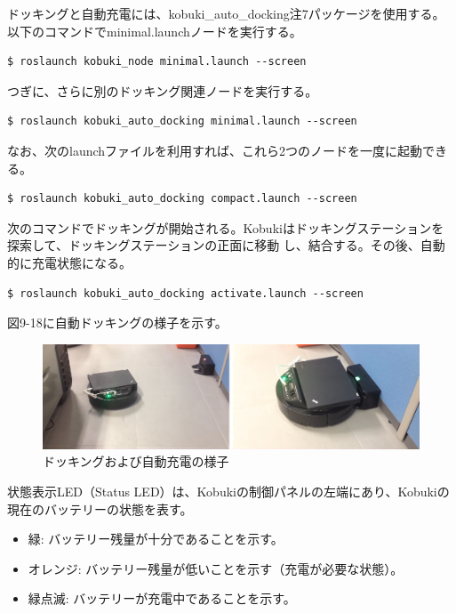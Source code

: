 \begin{itemize}
ドッキングと自動充電には、kobuki\_auto\_docking注7パッケージを使用する。以下のコマンドでminimal.launchノードを実行する。

\begin{lstlisting}[language=ROS]
$ roslaunch kobuki_node minimal.launch --screen
\end{lstlisting}

つぎに、さらに別のドッキング関連ノードを実行する。

\begin{lstlisting}[language=ROS]
$ roslaunch kobuki_auto_docking minimal.launch --screen
\end{lstlisting}

なお、次のlaunchファイルを利用すれば、これら2つのノードを一度に起動できる。

\begin{lstlisting}[language=ROS]
$ roslaunch kobuki_auto_docking compact.launch --screen
\end{lstlisting}

次のコマンドでドッキングが開始される。Kobukiはドッキングステーションを探索して、ドッキングステーションの正面に移動  し、結合する。その後、自動的に充電状態になる。

\begin{lstlisting}[language=ROS]
$ roslaunch kobuki_auto_docking activate.launch --screen
\end{lstlisting}

図9-18に自動ドッキングの様子を示す。

\begin{figure}[ht]
  \centering
  \includegraphics[width=\columnwidth]{pictures/chapter9/pic_09_18.png}
  \caption{ドッキングおよび自動充電の様子}
\end{figure}

\begin{exercise}[Kobukiとドッキングステーションの状態表示LED]

  状態表示LED（Status LED）は、Kobukiの制御パネルの左端にあり、Kobukiの現在のバッテリーの状態を表す。

  \begin{itemize}
  \item 緑: バッテリー残量が十分であることを示す。
  \item オレンジ: バッテリー残量が低いことを示す（充電が必要な状態）。
  \item 緑点滅: バッテリーが充電中であることを示す。
  \end{itemize}


\end{exercise}
\end{itemize}

